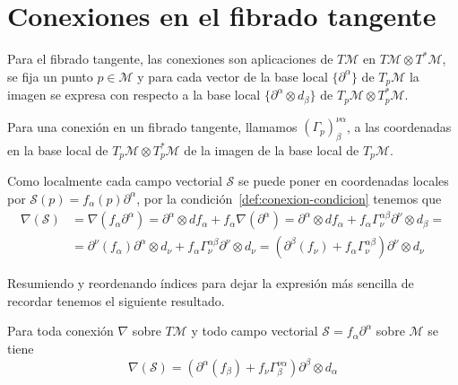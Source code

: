 \section{Conexiones en el fibrado tangente}\label{sec:conexiones-en-el-fibrado-tangente}

Para el fibrado tangente, las conexiones son aplicaciones de $T\mathcal{M}$ en $T\mathcal{M}\otimes T^*\mathcal{M}$, se fija un punto $p\in
\mathcal{M}$ y para cada vector de la base local $\{\partial^\alpha\}$ de $T_p \mathcal{M}$ la imagen se expresa con respecto a la
base local $\{\partial^\alpha\otimes d_\beta\}$ de $T_p\mathcal{M}\otimes T_p^*\mathcal{M}$.

\begin{definition}
  Para una conexión en un fibrado tangente, llamamos $(\Gamma_p)_\beta^{\nu\alpha}$,  a las coordenadas en la base local de $T_p\mathcal{M}\otimes T_p^*\mathcal{M}$ de la imagen
  de la base local de $T_p\mathcal{M}$.
\end{definition}

Como localmente cada campo vectorial $\mathcal{S}$ se
puede poner en coordenadas locales por $\mathcal{S}(p)=f_\alpha(p)\partial^\alpha$, por la condición~\ref{def:conexion-condicion} tenemos que
\begin{equation*}
  \begin{split}
    \nabla(\mathcal{S}) &=\nabla(f_\alpha
    \partial^\alpha)=\partial^\alpha\otimes df_\alpha+f_\alpha\nabla(\partial^\alpha)=
    \partial^\alpha\otimes df_\alpha+f_\alpha\Gamma_\nu^{\alpha\beta}\partial^\nu\otimes d_\beta=\\
    & = \partial^\nu(f_\alpha)\partial^\alpha\otimes d_\nu+f_\alpha\Gamma_\nu^{\alpha\beta}
    \partial^\nu\otimes d_\nu=(\partial^\beta(f_\nu)+f_\alpha\Gamma_\nu^{\alpha\beta})
    \partial^\nu\otimes d_\nu
  \end{split}
\end{equation*}

Resumiendo y reordenando índices para dejar la expresión más sencilla de recordar tenemos el siguiente resultado.
\begin{result}
  Para toda conexión $\nabla$ sobre $T\mathcal{M}$ y todo campo vectorial $\mathcal{S}=f_\alpha\partial^\alpha$
  sobre $\mathcal{\mathcal{M}}$ se tiene
  \begin{equation}
    \label{eq:conexion-coordenadas}
    \nabla(\mathcal{S}) = (\partial^\alpha(f_\beta)+f_\nu\Gamma_\beta^{\nu\alpha})\partial^\beta\otimes d_\alpha
  \end{equation}
\end{result}

